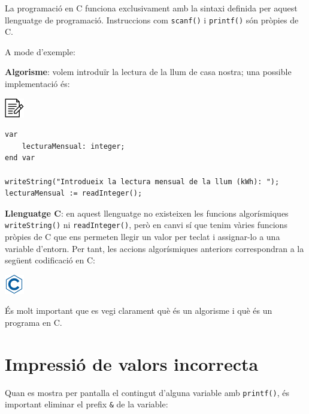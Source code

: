 \documentclass[]{book}
\newenvironment{Shaded}{\begin{snugshade}}{\end{snugshade}}
\newcommand{\DataTypeTok}[1]{\textcolor[rgb]{0.13,0.29,0.53}{#1}}
\newcommand{\StringTok}[1]{\textcolor[rgb]{0.31,0.60,0.02}{#1}}
\newcommand{\NormalTok}[1]{#1}
\begin{document}
La programació en C funciona exclusivament amb la sintaxi definida per
aquest llenguatge de programació. Instruccions com \texttt{scanf()} i
\texttt{printf()} són pròpies de C.

A mode d'exemple:

\textbf{Algorisme}: volem introduïr la lectura de la llum de casa
nostra; una possible implementació és:

\includegraphics{./img/alg.png}

\begin{verbatim}
var
    lecturaMensual: integer;
end var

writeString("Introdueix la lectura mensual de la llum (kWh): ");
lecturaMensual := readInteger();
\end{verbatim}

\textbf{Llenguatge C}: en aquest llenguatge no existeixen les funcions
algorísmiques \texttt{writeString()} ni \texttt{readInteger()}, però en
canvi sí que tenim vàries funcions pròpies de C que ens permeten llegir
un valor per teclat i assignar-lo a una variable d'entorn. Per tant, les
accions algorísmiques anteriors correspondran a la següent codificació
en C:

\includegraphics{./img/c.png}

\begin{Shaded}
\end{Shaded}

És molt important que es vegi clarament què és un algorisme i què és un
programa en C.

\section{Impressió de valors
incorrecta}\label{impressio-de-valors-incorrecta}

Quan es mostra per pantalla el contingut d'alguna variable amb
\texttt{printf()}, és important eliminar el prefix \texttt{\&} de la
variable:
\end{document}
